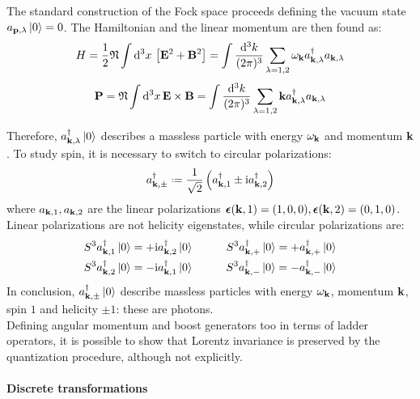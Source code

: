 The standard construction of the Fock space proceeds defining the vacuum state $ a_{\mathbf{p},\lambda} \ket{0} = 0 $. The Hamiltonian and the linear momentum are then found as:
\begin{equation}
  H = \frac{1}{2} \mathfrak{N} \int \mathrm{d}^3x\, \left[ \mathbf{E}^2 + \mathbf{B}^2 \right] = \int \frac{\mathrm{d}^3k}{(2\pi)^3} \sum_{\lambda = 1,2} \omega_{\mathbf{k}} a_{\mathbf{k},\lambda}^\dagger a_{\mathbf{k},\lambda}
\end{equation}
\begin{equation}
  \mathbf{P} = \mathfrak{N} \int \mathrm{d}^3x\, \mathbf{E} \times \mathbf{B} = \int \frac{\mathrm{d}^3k}{(2\pi)^3} \sum_{\lambda = 1,2} \mathbf{k} a_{\mathbf{k},\lambda}^\dagger a_{\mathbf{k},\lambda}
\end{equation}

Therefore, $ a_{\mathbf{k},\lambda}^\dagger \ket{0} $ describes a massless particle with energy $ \omega_{\mathbf{k}} $ and momentum $ \mathbf{k} $. To study spin, it is necessary to switch to circular polarizations:
\begin{equation}
  a_{\ve{k},\pm}\dg \defeq \frac{1}{\sqrt{2}} \left( a_{\ve{k},1}\dg \pm \img a_{\ve{k},2}\dg \right)
\end{equation}
where $ a_{\mathbf{k},1} , a_{\mathbf{k},2} $ are the linear polarizations $ \boldsymbol{\epsilon}(\mathbf{k},1) = (1,0,0) , \boldsymbol{\epsilon}(\mathbf{k},2) = (0,1,0) $. Linear polarizations are not helicity eigenstates, while circular polarizations are:
\begin{align*}
  S^3 a_{\mathbf{k},1}^\dagger \ket{0} = + \mathrm{i} a_{\mathbf{k},2}^\dagger \ket{0} & \qquad & S^3 a_{\mathbf{k},+}^\dagger \ket{0} = + a_{\mathbf{k},+}^\dagger \ket{0} \\
  S^3 a_{\mathbf{k},2}^\dagger \ket{0} = - \mathrm{i} a_{\mathbf{k},1}^\dagger \ket{0} & \qquad & S^3 a_{\mathbf{k},-}^\dagger \ket{0} = - a_{\mathbf{k},-}^\dagger \ket{0}
\end{align*}
In conclusion, $ a_{\mathbf{k},\pm}^\dagger \ket{0} $ describe massless particles with energy $ \omega_{\mathbf{k}} $, momentum $ \mathbf{k} $, spin $ 1 $ and helicity $ \pm 1 $: these are photons. \\
Defining angular momentum and boost generators too in terms of ladder operators, it is possible to show that Lorentz invariance is preserved by the quantization procedure, although not explicitly.

\paragraph{Discrete transformations}

